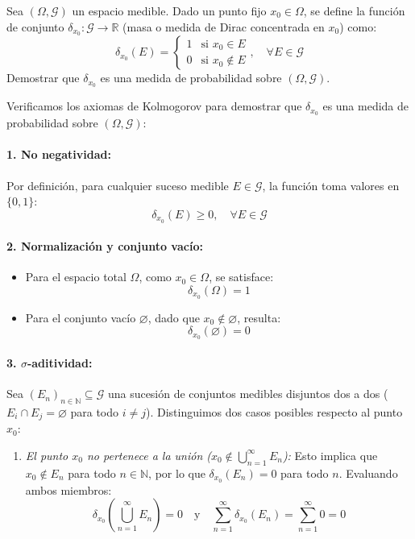 \begin{problema}
Sea $(\Omega, \mathcal{G})$ un espacio medible. Dado un punto fijo $x_0 \in \Omega$, se define la función de conjunto $\delta_{x_0} : \mathcal{G} \to \mathbb{R}$ (masa o medida de Dirac concentrada en $x_0$) como:
\[
    \delta_{x_0}(E) = \begin{cases} 1 & \text{si } x_0 \in E \\ 0 & \text{si } x_0 \notin E \end{cases}, \quad \forall E \in \mathcal{G}
\]
Demostrar que $\delta_{x_0}$ es una medida de probabilidad sobre $(\Omega, \mathcal{G})$.

\tcblower

Verificamos los axiomas de Kolmogorov para demostrar que $\delta_{x_0}$ es una medida de probabilidad sobre $(\Omega, \mathcal{G})$:

\paragraph{1. No negatividad:}
Por definición, para cualquier suceso medible $E \in \mathcal{G}$, la función toma valores en $\{0, 1\}$:
\[
    \delta_{x_0}(E) \ge 0, \quad \forall E \in \mathcal{G}
\]

\paragraph{2. Normalización y conjunto vacío:}
\begin{itemize}
    \item Para el espacio total $\Omega$, como $x_0 \in \Omega$, se satisface:
    \[
        \delta_{x_0}(\Omega) = 1
    \]
    \item Para el conjunto vacío $\varnothing$, dado que $x_0 \notin \varnothing$, resulta:
    \[
        \delta_{x_0}(\varnothing) = 0
    \]
\end{itemize}

\paragraph{3. $\sigma$-aditividad:}
Sea $(E_n)_{n \in \mathbb{N}} \subseteq \mathcal{G}$ una sucesión de conjuntos medibles disjuntos dos a dos ($E_i \cap E_j = \varnothing$ para todo $i \neq j$). Distinguimos dos casos posibles respecto al punto $x_0$:

\begin{enumerate}[label=\alph*)]
    \item \textit{El punto $x_0$ no pertenece a la unión ($x_0 \notin \bigcup_{n=1}^\infty E_n$):}
    Esto implica que $x_0 \notin E_n$ para todo $n \in \mathbb{N}$, por lo que $\delta_{x_0}(E_n) = 0$ para todo $n$. Evaluando ambos miembros:
    \[
        \delta_{x_0}\left( \bigcup_{n=1}^\infty E_n \right) = 0 \quad \text{y} \quad \sum_{n=1}^\infty \delta_{x_0}(E_n) = \sum_{n=1}^\infty 0 = 0
    \]


\end{enumerate}
\end{problema}
